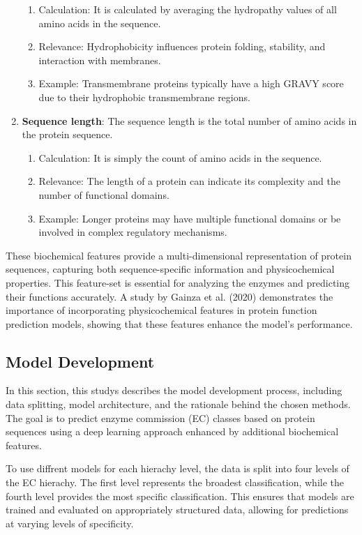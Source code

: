 \begin{enumerate}
    \begin{enumerate}
        \item Calculation: It is calculated by averaging the hydropathy values of all amino acids in the sequence.
        \item Relevance: Hydrophobicity influences protein folding, stability, and interaction with membranes.
        \item Example: Transmembrane proteins typically have a high GRAVY score due to their hydrophobic transmembrane regions.
    \end{enumerate}
    \item \textbf{Sequence length}: The sequence length is the total number of amino acids in the protein sequence.
    \begin{enumerate}
        \item Calculation: It is simply the count of amino acids in the sequence.
        \item Relevance: The length of a protein can indicate its complexity and the number of functional domains.
        \item Example: Longer proteins may have multiple functional domains or be involved in complex regulatory mechanisms.
    \end{enumerate}
\end{enumerate}

These biochemical features provide a multi-dimensional representation of protein sequences, capturing both sequence-specific information and physicochemical properties. This feature-set is essential for analyzing the enzymes and predicting their functions accurately. A study by Gainza et al. (2020) demonstrates the importance of incorporating physicochemical features in protein function prediction models, showing that these features enhance the model's performance. \autocite{gainzaDecipheringInteractionFingerprints2020}
\subsection{Model Development}
\label{sec:Model Development}

In this section, this studys describes the model development process, including data splitting, model architecture, and the rationale behind the chosen methods. The goal is to predict enzyme commission (EC) classes based on protein sequences using a deep learning approach enhanced by additional biochemical features.

To use diffrent models for each hierachy level, the data is split into four levels of the EC hierachy. The first level represents the broadest classification, while the fourth level provides the most specific classification. This ensures that models are trained and evaluated on appropriately structured data, allowing for predictions at varying levels of specificity.

